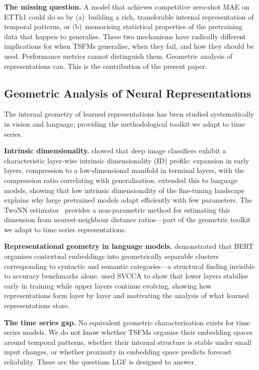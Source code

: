 \textbf{The missing question.}
A model that achieves competitive zero-shot MAE on ETTh1 could do so by
(a)~building a rich, transferable internal representation of temporal
patterns, or (b)~memorising statistical properties of the pretraining data
that happen to generalise.
These two mechanisms have radically different implications for when TSFMs
generalise, when they fail, and how they should be used.
Performance metrics cannot distinguish them.
Geometric analysis of representations can.
This is the contribution of the present paper.

\subsection{Geometric Analysis of Neural Representations}
\label{sec:rel_geometry}

The internal geometry of learned representations has been studied systematically
in vision and language, providing the methodological toolkit we adapt to
time series.

\textbf{Intrinsic dimensionality.}
\citet{ansuini2019intrinsic} showed that deep image classifiers exhibit a
characteristic layer-wise intrinsic dimensionality (ID) profile: expansion in
early layers, compression to a low-dimensional manifold in terminal layers, with
the compression ratio correlating with generalisation.
\citet{birdal2021intrinsic} extended this to language models, showing that low
intrinsic dimensionality of the fine-tuning landscape explains why large
pretrained models adapt efficiently with few parameters.
The TwoNN estimator~\cite{facco2017estimating} provides a non-parametric method
for estimating this dimension from nearest-neighbour distance ratios---part of
the geometric toolkit we adapt to time series representations.

\textbf{Representational geometry in language models.}
\citet{reif2019visualizing} demonstrated that BERT organises contextual
embeddings into geometrically separable clusters corresponding to syntactic and
semantic categories---a structural finding invisible to accuracy benchmarks alone.
\citet{raghu2017svcca} used SVCCA to show that lower layers stabilise early
in training while upper layers continue evolving, showing how representations form layer by layer and motivating the analysis
of what learned representations store.

\textbf{The time series gap.}
No equivalent geometric characterisation exists for time series models.
We do not know whether TSFMs organise their embedding spaces around temporal
patterns, whether their internal structure is stable under small input changes,
or whether proximity in embedding space predicts forecast reliability.
These are the questions LGF is designed to answer.


